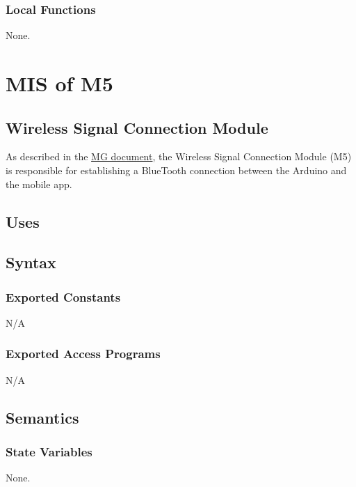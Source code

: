 \documentclass[12pt, titlepage]{article}
\begin{document}
\subsubsection{Local Functions}

None.


\section{MIS of M5 \label{WirelessSignalConnection}} 

\subsection{Wireless Signal Connection Module}

As described in the \href{https://github.com/NevoAbigail/Capstone/blob/main/docs/Design/SoftArchitecture/MG.pdf}{MG document}, the Wireless Signal Connection Module (M5) is responsible for establishing a BlueTooth connection between the Arduino and the mobile app.

\subsection{Uses}


\subsection{Syntax}

\subsubsection{Exported Constants}

N/A

\subsubsection{Exported Access Programs}

N/A

\subsection{Semantics}

\subsubsection{State Variables}

None.
\end{document}
